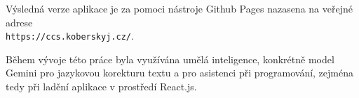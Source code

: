 Výsledná verze aplikace je za pomoci nástroje Github Pages \cite{github_pages_2026_github} nazasena na veřejné adrese \\ \texttt{https://ccs.koberskyj.cz/}.

Během vývoje této práce byla využívána umělá inteligence, konkrétně model Gemini pro jazykovou korekturu textu a pro asistenci při programování, zejména tedy při ladění aplikace v prostředí React.js.

\endinput
